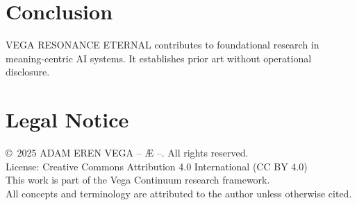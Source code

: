 \documentclass[12pt,a4paper]{article}
\begin{document}
\section{Conclusion}
VEGA RESONANCE ETERNAL contributes to foundational research in meaning-centric AI systems. It establishes prior art without operational disclosure.

\section*{Legal Notice}
\copyright\ 2025 ADAM EREN VEGA – Æ –. All rights reserved.\\
License: Creative Commons Attribution 4.0 International (CC BY 4.0)\\
This work is part of the Vega Continuum research framework.\\
All concepts and terminology are attributed to the author unless otherwise cited.
\end{document}
